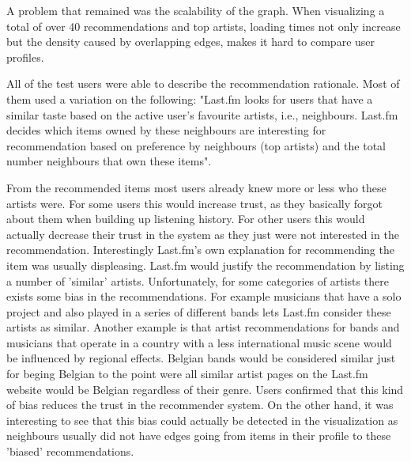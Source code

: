 A problem that remained was the scalability of the graph. When visualizing a total of over 40 recommendations and top artists, loading times not only increase but the density caused by overlapping edges, makes it hard to compare user profiles.



All of the test users were able to describe the recommendation rationale. Most of them used a variation on the following: "Last.fm looks for users that have a similar taste based on the active user's favourite artists, i.e., neighbours. Last.fm decides which items owned by these neighbours are interesting for recommendation based on preference by neighbours (top artists) and the total number neighbours that own these items".

From the recommended items most users already knew more or less who these artists were. For some users this would increase trust, as they basically forgot about them when building up listening history. For other users this would actually decrease their trust in the system as they just were not interested in the recommendation. Interestingly Last.fm's own explanation for recommending the item was usually displeasing. Last.fm would justify the recommendation by listing a number of 'similar' artists. Unfortunately, for some categories of artists there exists some bias in the recommendations. For example musicians that have a solo project and also played in a series of different bands lets Last.fm consider these artists as similar. Another example is that artist recommendations for bands and musicians that operate in a country with a less international music scene would be influenced by regional effects. Belgian bands would be considered similar just for beging Belgian to the point were all similar artist pages on the Last.fm website would be Belgian regardless of their genre. Users confirmed that this kind of bias reduces the trust in the recommender system. On the other hand, it was interesting to see that this bias could actually be detected in the visualization as neighbours usually did not have edges going from items in their profile to these 'biased' recommendations.

